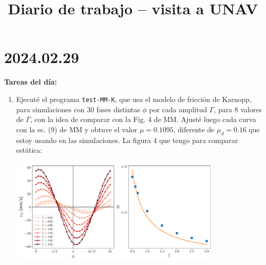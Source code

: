 \documentclass[11pt]{article}
\begin{document}
\title{Diario de trabajo -- visita a UNAV}

\section*{2024.02.29}
\textbf{Tareas del día:}
\begin{enumerate}
    \item Ejecuté el programa \texttt{test-MM-K}, que usa el modelo de fricción de Karnopp, para simulaciones con 30 fases distintas $\phi$ por cada amplitud $\Gamma$, para 8 valores de $\Gamma$, con la idea de comparar con la Fig. 4 de MM. Ajusté luego cada curva con la ec. (9) de MM y obtuve el valor $\mu = 0.1095$, diferente de $\mu_d = 0.16$ que estoy usando en las simulaciones. La figura 4 que tengo para comparar estática:
        \begin{center}
            \includegraphics[width=0.8\textwidth]{figs/Fig_4_MM.pdf}
        \end{center}
\end{enumerate}
\end{document}
